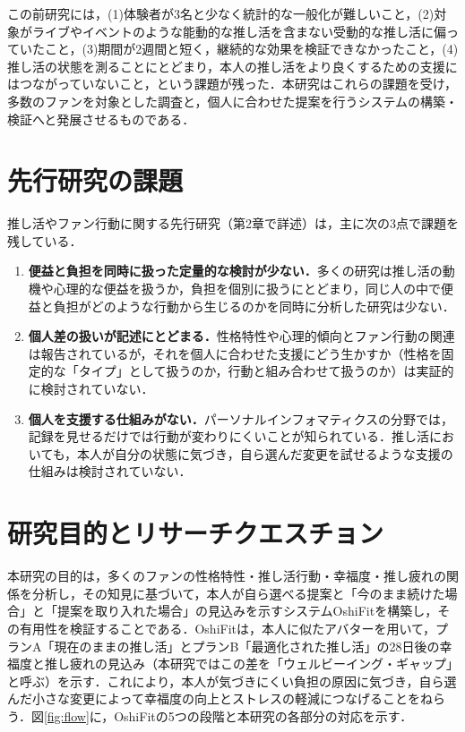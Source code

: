 この前研究には，(1)体験者が3名と少なく統計的な一般化が難しいこと，(2)対象がライブやイベントのような能動的な推し活を含まない受動的な推し活に偏っていたこと，(3)期間が2週間と短く，継続的な効果を検証できなかったこと，(4)推し活の状態を測ることにとどまり，本人の推し活をより良くするための支援にはつながっていないこと，という課題が残った．本研究はこれらの課題を受け，多数のファンを対象とした調査と，個人に合わせた提案を行うシステムの構築・検証へと発展させるものである．

\section{先行研究の課題}
推し活やファン行動に関する先行研究（第2章で詳述）は，主に次の3点で課題を残している．

\begin{enumerate}
\item \textbf{便益と負担を同時に扱った定量的な検討が少ない．}多くの研究は推し活の動機や心理的な便益を扱うか，負担を個別に扱うにとどまり，同じ人の中で便益と負担がどのような行動から生じるのかを同時に分析した研究は少ない．
\item \textbf{個人差の扱いが記述にとどまる．}性格特性や心理的傾向とファン行動の関連は報告されているが，それを個人に合わせた支援にどう生かすか（性格を固定的な「タイプ」として扱うのか，行動と組み合わせて扱うのか）は実証的に検討されていない．
\item \textbf{個人を支援する仕組みがない．}パーソナルインフォマティクスの分野では，記録を見せるだけでは行動が変わりにくいことが知られている\cite{li2010,choe2014}．推し活においても，本人が自分の状態に気づき，自ら選んだ変更を試せるような支援の仕組みは検討されていない．
\end{enumerate}

\section{研究目的とリサーチクエスチョン}
本研究の目的は，多くのファンの性格特性・推し活行動・幸福度・推し疲れの関係を分析し，その知見に基づいて，本人が自ら選べる提案と「今のまま続けた場合」と「提案を取り入れた場合」の見込みを示すシステムOshiFitを構築し，その有用性を検証することである．OshiFitは，本人に似たアバターを用いて，プランA「現在のままの推し活」とプランB「最適化された推し活」の28日後の幸福度と推し疲れの見込み（本研究ではこの差を「ウェルビーイング・ギャップ」と呼ぶ）を示す．これにより，本人が気づきにくい負担の原因に気づき，自ら選んだ小さな変更によって幸福度の向上とストレスの軽減につなげることをねらう．図\ref{fig:flow}に，OshiFitの5つの段階と本研究の各部分の対応を示す．

